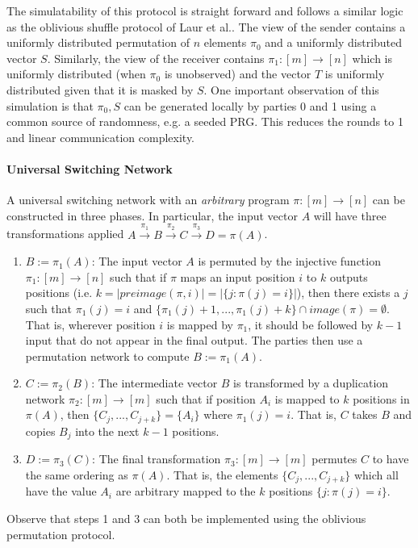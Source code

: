 The simulatability of this protocol is straight forward and follows a similar logic as the oblivious shuffle protocol of Laur et al.\cite{LWZ11}. The view of the sender contains a uniformly distributed permutation of $n$ elements $\pi_0$ and a uniformly distributed vector $S$. Similarly, the view of the receiver contains $\pi_1: [m]\rightarrow [n]$ which is uniformly distributed (when $\pi_0$ is unobserved) and the vector $T$ is uniformly distributed given that it is masked by $S$. One important observation of this simulation is that $\pi_0,S$ can be generated locally by parties 0 and 1 using a common source of randomness, e.g. a seeded PRG. This reduces the rounds to 1 and linear communication complexity. 

\paragraph{Universal Switching Network}\label{sec:switch}

A universal switching network with an \emph{arbitrary} program $\pi : [m]\rightarrow [n]$ can be constructed in three phases\cite{MS13}. In particular, the input vector $A$ will have three transformations applied $A\overset{\pi_1}{\rightarrow}B\overset{\pi_2}{\rightarrow}C\overset{\pi_3}{\rightarrow}D=\pi(A)$.
\begin{enumerate}
	\item $B:=\pi_1(A)$:  The input vector $A$ is permuted by the injective function $\pi_1:[m]\rightarrow[n]$ such that if $\pi$ maps an input position $i$ to $k$ outputs positions (i.e. $k=|preimage(\pi,i)|=|\{ j : \pi(j)=i \}|$), then there exists a $j$ such that $\pi_1(j)=i$  and $\{\pi_1(j)+ 1,...,\pi_1(j )+k \} \cap image(\pi) = \emptyset$. That is, wherever position $i$ is mapped by $\pi_1$, it should be followed by $k-1$ input that do not appear in the final output. The parties then use a permutation network to compute $B:=\pi_1(A)$.
	
	\item $C:=\pi_2(B)$: The intermediate vector $B$ is transformed by a duplication network $\pi_2:[m]\rightarrow[m]$ such that if position $A_i$ is mapped to $k$ positions in $\pi(A)$, then $\{ C_{j},...,C_{j+k}\} = \{A_i\}$ where $\pi_1(j)=i$. That is, $C$ takes $B$ and copies $B_{j}$ into the next $k-1$ positions. 
	
	\item $D:=\pi_3(C)$: The final transformation $\pi_3:[m]\rightarrow[m]$  permutes $C$ to have the same ordering as $\pi(A)$. That is, the elements $\{ C_{j},...,C_{j+k}\}$ which all have the value  $A_i$ are arbitrary mapped to the $k$ positions $\{ j : \pi(j)=i \}$.
\end{enumerate}
Observe that steps 1 and 3 can both be implemented using the oblivious permutation protocol.%


